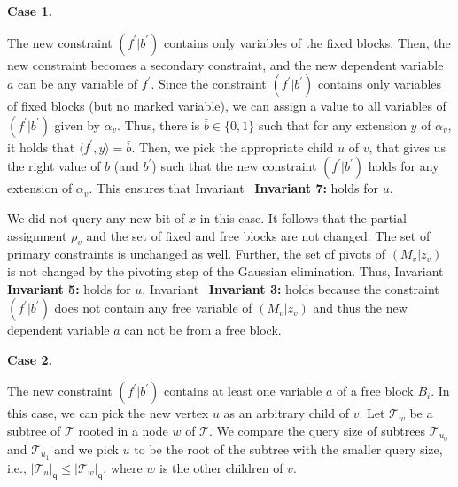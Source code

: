\par\medskip\noindent\textbf{Case 1.}\par




The new constraint $(f^{\prime}|b^{\prime})$ contains only variables of the fixed blocks.
Then, the new constraint becomes a secondary constraint, and the new dependent variable $a$ can be any variable of $f^{\prime}$.
Since the constraint $(f^{\prime}|b^{\prime})$ contains only variables of fixed blocks (but no marked variable), we can assign a value to all variables of $(f^{\prime}|b^{\prime})$ given by $\alpha_{v}$.
Thus, there is $\bar{b}\in\{0,1\}$ such that for any extension $y$ of $\alpha_{v}$, it holds that $\langle f^{\prime},y\rangle=\bar{b}$.
Then, we pick the appropriate child $u$ of $v$, that gives us the right value of $b$ (and $b^{\prime}$) such that the new constraint $(f^{\prime}|b^{\prime})$ holds for any extension of $\alpha_{v}$. This ensures that Invariant \textbf{ Invariant 7:} holds for $u$.\par




We did not query any new bit of $x$ in this case.
It follows that the partial assignment $\rho_{v}$ and the set of fixed and free blocks are not changed.
The set of primary constraints is unchanged as well.
Further, the set of pivots of $(M_{v}|z_{v})$ is not changed by the pivoting step of the Gaussian elimination.
Thus, Invariant \textbf{ Invariant 5:} holds for $u$.
Invariant \textbf{ Invariant 3:} holds because the constraint $(f^{\prime}|b^{\prime})$ does not contain any free variable of $(M_{v}|z_{v})$ and thus the new dependent variable $a$ can not be from a free block.\par





\par\medskip\noindent\textbf{Case 2.}\par




The new constraint $(f^{\prime}|b^{\prime})$ contains at least one variable $a$ of a free block $B_{i}$.
In this case, we can pick the new vertex $u$ as an arbitrary child of $v$.
Let $\mathcal{T}_{w}$ be a subtree of $\mathcal{T}$ rooted in a node $w$ of $\mathcal{T}$.
We compare the query size of subtrees $\mathcal{T}_{u_{0}}$ and $\mathcal{T}_{u_{1}}$ and we pick $u$ to be the root of the subtree with the smaller query size, i.e., $|\mathcal{T}_{u}|_{\mathsf{q}}\leq|\mathcal{T}_{w}|_{\mathsf{q}}$, where $w$ is the other children of $v$.\par




